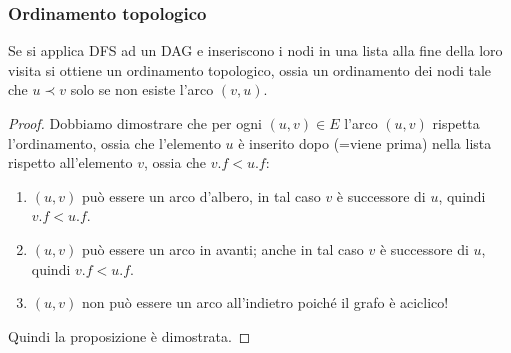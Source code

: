 \documentclass[a4paper,10pt]{article}
\theoremstyle{definition}
\begin{document}
\subsubsection{Ordinamento topologico}
Se si applica DFS ad un DAG e inseriscono i nodi in una lista alla fine della loro visita si ottiene un ordinamento topologico, ossia un ordinamento dei nodi tale che $u\prec v$ solo se non esiste l'arco $(v, u)$.

\begin{proof}
    Dobbiamo dimostrare che per ogni $(u, v) \in E$ l'arco $(u, v)$ rispetta l'ordinamento, ossia che l'elemento $u$ è inserito dopo (=viene prima) nella lista rispetto all'elemento $v$, ossia che $v.f < u.f$:
    \begin{enumerate}
     \item $(u, v)$ può essere un arco d'albero, in tal caso $v$ è successore di $u$, quindi $v.f<u.f$. 
     \item $(u, v)$ può essere un arco in avanti; anche in tal caso $v$ è successore di $u$, quindi $v.f<u.f$. 
     \item $(u, v)$ non può essere un arco all'indietro poiché il grafo è aciclico!
    \end{enumerate}
Quindi la proposizione è dimostrata.
\end{proof}
\end{document}
